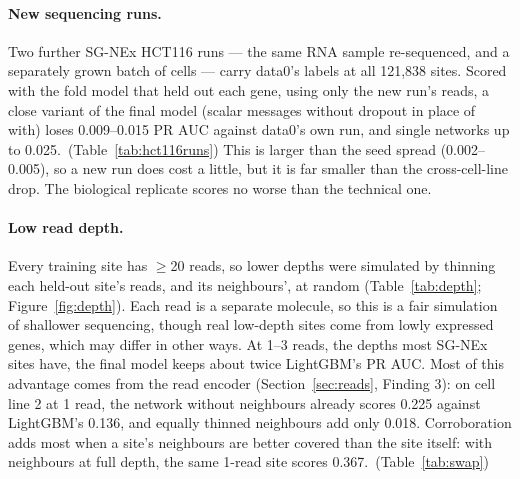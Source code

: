 \documentclass[11pt,a4paper]{article}
\begin{document}
\paragraph{New sequencing runs.} Two further SG-NEx HCT116 runs --- the same
RNA sample re-sequenced, and a separately grown batch of cells --- carry
data0's labels at all 121,838 sites. Scored with the fold model that held
out each gene, using only the new run's reads, a close variant of the final
model (scalar messages without dropout in place of with) loses 0.009--0.015
PR AUC against data0's own run, and single networks up to
0.025.~(Table~\ref{tab:hct116runs}) This is larger than the seed spread
(0.002--0.005), so a new run does cost a little, but it is far smaller than
the cross-cell-line drop. The biological replicate scores no worse than
the technical one.

\paragraph{Low read depth.} Every training site has $\ge$20 reads, so lower
depths were simulated by thinning each held-out site's reads, and its
neighbours', at random (Table~\ref{tab:depth}; Figure~\ref{fig:depth}). Each
read is a separate molecule, so this is a fair simulation of shallower
sequencing, though real low-depth sites come from lowly expressed genes,
which may differ in other ways. At 1--3 reads, the depths most SG-NEx sites
have, the final model keeps about twice LightGBM's PR AUC. Most of this
advantage comes from the read encoder (Section~\ref{sec:reads}, Finding 3):
on cell line 2 at 1 read, the network without neighbours already scores
0.225 against LightGBM's 0.136, and equally thinned neighbours add only
0.018. Corroboration adds most when a site's neighbours are better covered
than the site itself: with neighbours at full depth, the same 1-read site
scores 0.367.~(Table~\ref{tab:swap})


\end{document}
